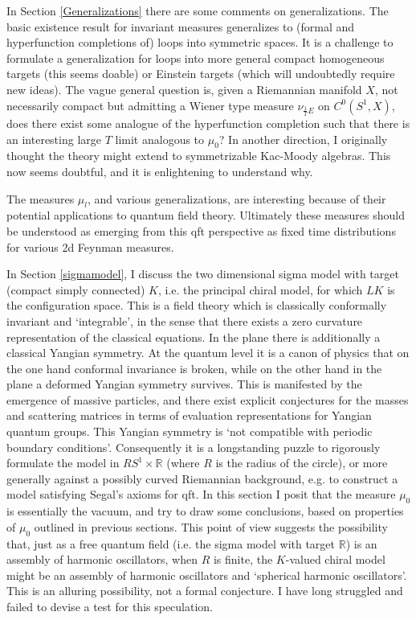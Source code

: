 \documentclass{amsart}
\theoremstyle{conjecture}
\theoremstyle{definition}
\theoremstyle{question}
\theoremstyle{questions}
\theoremstyle{remark}
\theoremstyle{remarks}
\theoremstyle{example}
\numberwithin{equation}{section}
\begin{document}
In Section \ref{Generalizations} there are some comments on generalizations. The basic existence result for invariant measures generalizes to (formal and hyperfunction completions of) loops into symmetric spaces. It is a challenge to formulate a generalization for loops into more general compact homogeneous targets (this seems doable) or Einstein targets (which will undoubtedly require new ideas). The vague general question is, given a Riemannian manifold $X$, not necessarily compact but admitting a Wiener type measure $\nu_{\frac 1T E}$ on
$C^0(S^1,X)$, does there exist some analogue of the hyperfunction completion such that there is an interesting large $T$ limit analogous to $\mu_0$? In another direction, I originally thought the theory might extend to symmetrizable Kac-Moody algebras. This now seems doubtful, and it is enlightening to understand why. 

The measures $\mu_l$, and various generalizations, are interesting because of their potential applications to quantum field theory. Ultimately these measures should be understood as emerging from this qft perspective as fixed time distributions for various 2d Feynman measures.

In Section \ref{sigmamodel}, I discuss the two dimensional sigma model with target (compact simply connected) $K$, i.e. the principal chiral model, for which $LK$ is the configuration space.  This is a field theory which is classically conformally invariant and `integrable', in the sense that there exists a zero curvature representation of the classical equations. In the plane there
is additionally a classical Yangian symmetry. At the quantum level it is a canon of physics that on the one hand conformal invariance is broken, while on the other hand in the plane a deformed Yangian symmetry survives. This is manifested by the emergence of massive particles, and there exist explicit conjectures for the masses and scattering matrices in terms of evaluation representations for Yangian quantum groups. This Yangian symmetry is `not compatible with periodic boundary conditions'. Consequently it is a longstanding puzzle to rigorously formulate the model in $RS^1\times \mathbb R$ (where $R$ is the radius of the circle), or more generally against a possibly curved Riemannian background, e.g. to construct a model satisfying Segal's axioms for qft. In this section I posit that the measure $\mu_0$ is essentially the vacuum, and try to draw some conclusions, based on properties of $\mu_0$ outlined in previous sections. This point of view suggests the possibility that, just as a free quantum field (i.e. the sigma model with target $\mathbb R$) is an assembly of harmonic oscillators, when $R$ is finite, the $K$-valued chiral model might be an assembly of harmonic oscillators and `spherical harmonic oscillators'. This is an alluring possibility, not a formal conjecture. I have long struggled and failed to devise a test for this speculation.
\end{document}
